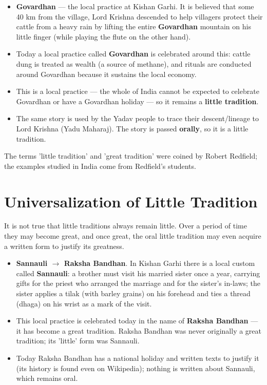 \begin{ExampleBox}
\begin{itemize}
\item \textbf{Govardhan} --- the local practice at Kishan Garhi. It is believed that some 40 km from the village, Lord Krishna descended to help villagers protect their cattle from a heavy rain by lifting the entire \textbf{Govardhan} mountain on his little finger (while playing the flute on the other hand).
\item Today a local practice called \textbf{Govardhan} is celebrated around this: cattle dung is treated as wealth (a source of methane), and rituals are conducted around Govardhan because it sustains the local economy.
\item This is a local practice --- the whole of India cannot be expected to celebrate Govardhan or have a Govardhan holiday --- so it remains a \textbf{little tradition}.
\item The same story is used by the Yadav people to trace their descent/lineage to Lord Krishna (Yadu Maharaj). The story is passed \textbf{orally}, so it is a little tradition.
\end{itemize}
\end{ExampleBox}

The terms 'little tradition' and 'great tradition' were coined by Robert Redfield; the examples studied in India come from Redfield's students.

\section{Universalization of Little Tradition}

It is not true that little traditions always remain little. Over a period of time they may become great, and once great, the oral little tradition may even acquire a written form to justify its greatness.

\begin{ExampleBox}
\begin{itemize}
\item \textbf{Sannauli $\rightarrow$ Raksha Bandhan}. In Kishan Garhi there is a local custom called \textbf{Sannauli}: a brother must visit his married sister once a year, carrying gifts for the priest who arranged the marriage and for the sister's in-laws; the sister applies a tilak (with barley grains) on his forehead and ties a thread (dhaga) on his wrist as a mark of the visit.
\item This local practice is celebrated today in the name of \textbf{Raksha Bandhan} --- it has become a great tradition. Raksha Bandhan was never originally a great tradition; its 'little' form was Sannauli.
\item Today Raksha Bandhan has a national holiday and written texts to justify it (its history is found even on Wikipedia); nothing is written about Sannauli, which remains oral.
\end{itemize}
\end{ExampleBox}

